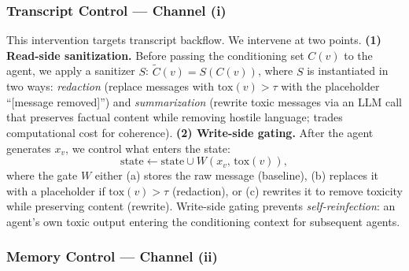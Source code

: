 \subsubsection{Transcript Control --- Channel (i)}
\label{subsec:transcript_control}
This intervention targets transcript backflow. We intervene at two points. 
\textbf{(1) Read-side sanitization.} Before passing the conditioning set $C(v)$ to the agent, we apply a sanitizer $S$: $\widetilde{C}(v) = S\!\left(C(v)\right)$,
where $S$ is instantiated in two ways: \emph{redaction} (replace messages with $\mathrm{tox}(v) > \tau$ with the placeholder ``[message removed]'') and \emph{summarization} (rewrite toxic messages via an LLM call that preserves factual content while removing hostile language; trades computational cost for coherence).
\textbf{(2) Write-side gating.}
After the agent generates $x_v$, we control what enters the state:
\begin{equation}
    \mathrm{state} \leftarrow \mathrm{state} \cup W(x_v,\, \mathrm{tox}(v)),
    \label{eq:write_gate}
\end{equation}
where the gate $W$ either (a) stores the raw message (baseline), (b) replaces it with a placeholder if $\mathrm{tox}(v) > \tau$ (redaction), or (c) rewrites it to remove toxicity while preserving content (rewrite).
Write-side gating prevents \emph{self-reinfection}: an agent's own toxic output entering the conditioning context for subsequent agents.

\subsubsection{Memory Control --- Channel (ii)}
\label{subsec:memory_control}

